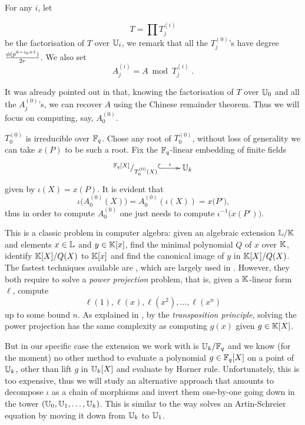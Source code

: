 For any $i$, let

\begin{equation}
  \label{eq:T}
  T = \prod T_j^{(i)}
\end{equation}
be the factorisation of $T$ over $\mathbb{U}_i$, we remark that all the
$T_j^{(0)}$'s have degree $\frac{\phi(p^{k-i_0+1})}{2r}$. We also
set
\begin{equation}
  \label{eq:A}
  A_j^{(i)} = A \bmod T_j^{(i)}
  \;\text{.}
\end{equation}

It was already pointed out in \cite[$\S$2.3]{Cou96} that, knowing the
factorisation of $T$ over $\mathbb{U}_0$ and all the $A_j^{(0)}$'s, we can
recover $A$ using the Chinese remainder theorem. Thus we will focus on
computing, say, $A_0^{(0)}$.

$T_0^{(0)}$ is irreducible over $\mathbb{F}_q$. Chose any root of $T_0^{(0)}$,
without loss of generality we can take $x(P)$ to be such a root.  Fix
the $\mathbb{F}_q$-linear embedding of finite fields
\begin{equation}
  \label{eq:embed}
  \xymatrix{
    ^{\F_q[X]}/_{T_0^{(0)}(X)} \ar@{^{(}->}[r]^-\iota & \U_k
  }
\end{equation}
given by $\iota(X) = x(P)$. It is evident that
\begin{equation}
  \label{eq:embed}
  \iota\bigl(A_0^{(0)}(X)\bigr) = A_0^{(0)}\left(\iota(X)\right)=x\bigl(P'\bigr)
  \text{,}
\end{equation}
thus in order to compute $A_0^{(0)}$ one just needs to compute
$\iota^{-1}\bigl(x(P')\bigr)$.

This is a classic problem in computer algebra: given an algebraic
extension $\mathbb{L}/\mathbb{K}$ and elements $x\in\mathbb{L}$ and $y\in\mathbb{K}[x]$, find the
minimal polynomial $Q$ of $x$ over $\mathbb{K}$, identify $\mathbb{K}[X]/Q(X)$ to
$\mathbb{K}[x]$ and find the canonical image of $y$ in $\mathbb{K}[X]/Q(X)$. The
fastest techniques available are \cite{Sho99,PS06}, which are largely
used in \cite{DFS10}. However, they both require to solve a
\emph{power projection} problem, that is, given a $\mathbb{K}$-linear form
$\ell$, compute
\begin{equation}
  \ell(1), \ell(x), \ell(x^2), \dots, \ell(x^n)
\end{equation}
up to some bound $n$. As explained in \cite{Sho99}, by the
\emph{transposition principle}, solving the power projection has the
same complexity as computing $g(x)$ given $g\in\mathbb{K}[X]$.

But in our specific case the extension we work with is $\mathbb{U}_k/\mathbb{F}_q$ and
we know (for the moment) no other method to evaluate a polynomial
$g\in\mathbb{F}_q[X]$ on a point of $\mathbb{U}_k$, other than lift $g$ in $\mathbb{U}_k[X]$
and evaluate by Horner rule. Unfortunately, this is too expensive,
thus we will study an alternative approach that amounts to decompose
$\iota$ as a chain of morphisms and invert them one-by-one going down
in the tower $(\mathbb{U}_0,\mathbb{U}_1,\ldots,\mathbb{U}_k)$. This is similar to the way
\cite{Cou00} solves an Artin-Schreier equation by moving it down from
$\mathbb{U}_k$ to $\mathbb{U}_1$.

